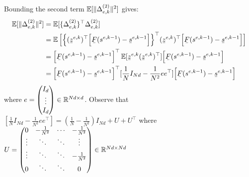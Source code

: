Bounding the second term $\operatorname*{\mathbb{E}}[\lVert\Delta_{e,k}^{(2)}\rVert^2] $ gives:
\begin{equation}
\begin{split}
\E[\norm{\Delta_{e,k}^{(2)}}^2]  & = \E[\{\Delta_{e,k}^{(2)}\}^\top\Delta_{e,k}^{(2)}]  \\
& =  \E \Big[\Big\{ (\barbelow{z}^{e,k})^\top \Big[ \barbelow{F}(s^{e,k-1}) - \barbelow{s}^{e,k-1} \Big] \Big\}^\top (\barbelow{z}^{e,k})^\top \Big[ \barbelow{F}(s^{e,k-1}) - \barbelow{s}^{e,k-1} \Big] \Big] \\
& = \Big[ \barbelow{F}(s^{e,k-1}) - \barbelow{s}^{e,k-1} \Big]^\top \E[\barbelow{z}^{e,k} (\barbelow{z}^{e,k})^\top ]  \Big[ \barbelow{F}(s^{e,k-1}) - \barbelow{s}^{e,k-1} \Big] \\
& =  \Big[ \barbelow{F}(s^{e,k-1}) - \barbelow{s}^{e,k-1} \Big]^\top [\frac{1}{N} I_{Nd} - \frac{1}{N^2} ee^\top]  \Big[ \barbelow{F}(s^{e,k-1}) - \barbelow{s}^{e,k-1} \Big] \\
\end{split}
\end{equation}
where $e = \begin{pmatrix} 
I_d  \\
\vdots  \\
I_d
\end{pmatrix} \in \mathbb{R}^{Nd \times d}$. 
Observe that $[\frac{1}{N} I_{Nd} - \frac{1}{N^2} ee^\top] = (\frac{1}{N} - \frac{1}{N^2})I_{Nd} + U + U^\top$ where $U = \begin{pmatrix} 
0 & - \frac{1}{N^2} & \cdots & -  \frac{1}{N^2}\\
\vdots  & \ddots & \ddots & \vdots \\
\vdots  & \ddots & \ddots & - \frac{1}{N^2} \\
0  & \ddots & \ddots & 0 
\end{pmatrix} \in \mathbb{R}^{Nd \times Nd}$


